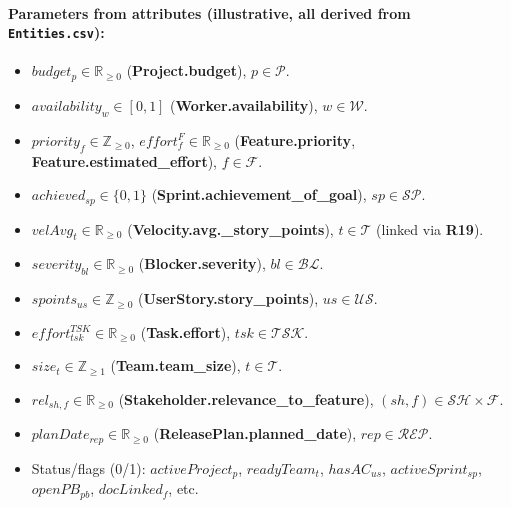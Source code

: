 \documentclass[11pt,a4paper]{article}
\begin{document}
\paragraph{Parameters from attributes (illustrative, all derived from \texttt{Entities.csv}):}
\begin{itemize}[leftmargin=2em]
  \item $budget_p \in \mathbb{R}_{\ge 0}$ (\textbf{Project.budget}), $p\in\mathcal{P}$.
  \item $availability_w \in [0,1]$ (\textbf{Worker.availability}), $w\in\mathcal{W}$.
  \item $priority_f \in \mathbb{Z}_{\ge 0}$, $effort^{F}_f \in \mathbb{R}_{\ge 0}$ (\textbf{Feature.priority}, \textbf{Feature.estimated\_effort}), $f\in\mathcal{F}$.
  \item $achieved_{sp} \in \{0,1\}$ (\textbf{Sprint.achievement\_of\_goal}), $sp\in\mathcal{SP}$.
  \item $velAvg_t \in \mathbb{R}_{\ge 0}$ (\textbf{Velocity.avg.\_story\_points}), $t\in\mathcal{T}$ (linked via \textbf{R19}).
  \item $severity_{bl} \in \mathbb{R}_{\ge 0}$ (\textbf{Blocker.severity}), $bl\in\mathcal{BL}$.
  \item $spoints_{us} \in \mathbb{Z}_{\ge 0}$ (\textbf{UserStory.story\_points}), $us\in\mathcal{US}$.
  \item $effort^{TSK}_{tsk} \in \mathbb{R}_{\ge 0}$ (\textbf{Task.effort}), $tsk\in\mathcal{TSK}$.
  \item $size_t \in \mathbb{Z}_{\ge 1}$ (\textbf{Team.team\_size}), $t\in\mathcal{T}$.
  \item $rel_{sh,f} \in \mathbb{R}_{\ge 0}$ (\textbf{Stakeholder.relevance\_to\_feature}), $(sh,f)\in\mathcal{SH}\times\mathcal{F}$.
  \item $planDate_{rep} \in \mathbb{R}_{\ge 0}$ (\textbf{ReleasePlan.planned\_date}), $rep\in\mathcal{REP}$.
  \item Status/flags (0/1): $activeProject_p$, $readyTeam_t$, $hasAC_{us}$, $activeSprint_{sp}$, $openPB_{pb}$, $docLinked_f$, etc.
\end{itemize}
\end{document}
